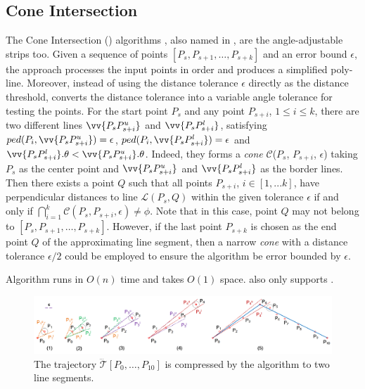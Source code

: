 \subsection {Cone Intersection}

The Cone Intersection (\cia) algorithms \cite{Williams:Longest,Sklansky:Cone,Dunham:Cone}, also named \sleeve in \cite{Zhao:Sleeve}, are {the angle-adjustable strips too}.
Given a sequence of points $[P_{s}, P_{s+1}, \ldots, P_{s+k}]$ and an error bound $\epsilon$, the \cia approach processes the input points in order and produces a simplified poly-line.  Moreover, instead of using the distance tolerance $\epsilon$ directly as the distance threshold, \cia converts the distance tolerance into a variable angle tolerance for testing the points.
%
For the start point $P_s$ and any point $P_{s+i}$, $1\le i\le k$, there are two different lines $\vv{P_sP^u_{s+i}}$ and $\vv{P_sP^l_{s+i}}$, satisfying $ped(P_i, \vv{P_sP^u_{s+i}}) = \epsilon$, $ped(P_i, \vv{P_sP^l_{s+i}}) = \epsilon$ and $\vv{P_sP^l_{s+i}}.\theta < \vv{P_sP^u_{s+i}}.\theta$. Indeed, they forms a \emph{cone} $\mathcal{C}$($P_s$, $P_{s+i}$, $\epsilon$) taking $P_s$ as the center point and $\vv{P_sP^u_{s+i}}$ and $\vv{P_sP^l_{s+i}}$ as the border lines.
Then there exists a point $Q$ such that all points $P_{s+i}$, $i \in [1, ... k]$, have perpendicular distances to
line $\mathcal{L}(P_s,Q)$ within the given \ped tolerance $\epsilon$ if and only if $\bigcap_{i=1}^{k}\mathcal{C}(P_s, P_{s+i}, \epsilon) \ne \phi$.
Note that in this case, point $Q$ may not belong to $[P_{s}, P_{s+1}, \ldots, P_{s+k}]$.
However, if the last point $P_{s+k}$ is chosen as the end point $Q$ of the approximating line segment, then a narrow \emph{cone} with a distance tolerance $\epsilon/2$ could be employed to ensure the algorithm be \ped error bounded by $\epsilon$\cite{Zhao:Sleeve}.

Algorithm \cia runs in $O(n)$ time and takes $O(1)$ space.
\cia also only supports \ped.


\begin{figure}[tb!]
\centering
\includegraphics[scale=0.66]{figures/Fig-sleeve.png}
\vspace{-1ex}
\caption{\small The trajectory $\dddot{\mathcal{T}}[P_0, \ldots, P_{10}]$ is compressed by the \conei algorithm to two line segments.}
\vspace{-2ex}
\label{fig:sleeve}
\end{figure}



